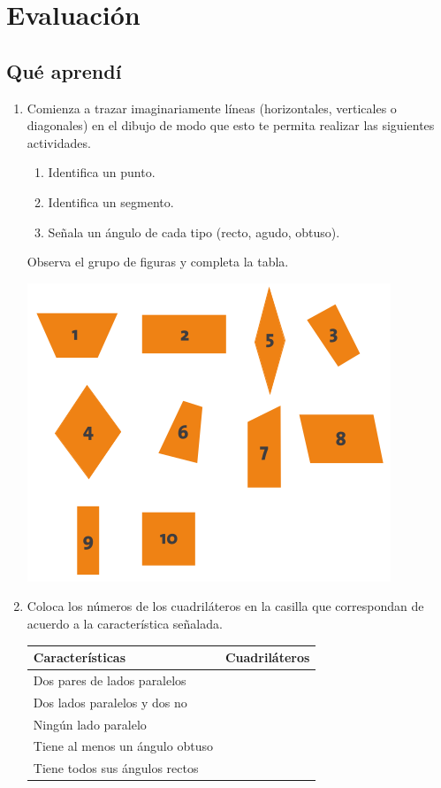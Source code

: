 \documentclass[10pt,twoside]{article}
\begin{document}
\section*{Evaluaci\'on}
\subsection*{Qu\'{e} aprend\'{i}}
\begin{enumerate}
\item Comienza a trazar imaginariamente líneas (horizontales,
verticales o diagonales) en el dibujo de modo que esto te
permita realizar las siguientes actividades.
\begin{enumerate}
\item Identifica un punto.
\item Identifica un segmento.
\item Señala un ángulo de cada tipo (recto, agudo, obtuso).
\end{enumerate}
Observa el grupo de figuras y completa la tabla.
\begin{center}
\includegraphics[scale=.75]{Images/Figuras.png} 
\end{center}
\item Coloca los números de los cuadriláteros en la casilla que
correspondan de acuerdo a la característica señalada.
\begin{center}
\begin{tabular}{|l|c|}
\hline 
\hspace*{40pt} Características & Cuadriláteros \\ 
\hline 
Dos pares de lados paralelos &  \\ 
\hline 
Dos lados paralelos y dos no  &  \\ 
\hline 
Ningún lado paralelo &  \\ 
\hline 
Tiene al menos un ángulo obtuso &  \\ 
\hline 
Tiene todos sus ángulos rectos &  \\ 
\hline 
\end{tabular} 
\end{center}
\end{enumerate}
\end{document}
